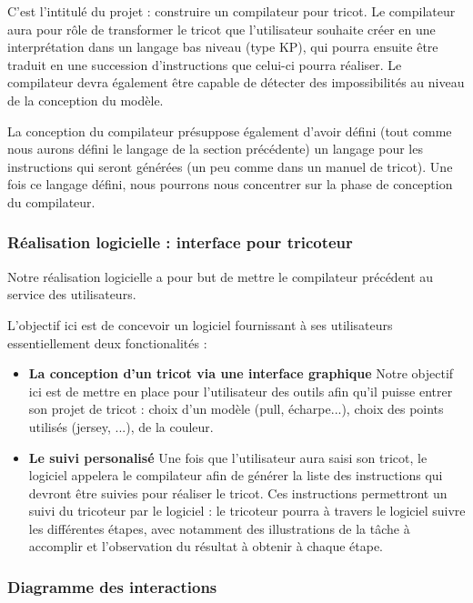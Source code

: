 \documentclass{article}
\begin{document}
C'est l'intitulé du projet : construire un compilateur pour tricot. Le compilateur aura pour rôle de transformer le tricot que
l'utilisateur souhaite créer en une interprétation dans un langage bas niveau (type KP), qui pourra ensuite être traduit en une succession
d'instructions que celui-ci pourra réaliser.
Le compilateur devra également être capable de détecter des impossibilités au niveau de la conception du modèle.

La conception du compilateur présuppose également d'avoir défini (tout comme nous aurons défini le langage de la section précédente) un
langage pour les instructions qui seront générées (un peu comme dans un manuel de tricot).
Une fois ce langage défini, nous pourrons nous concentrer sur la phase de conception du compilateur.

\subsubsection{Réalisation logicielle : interface pour tricoteur}

Notre réalisation logicielle a pour but de mettre le compilateur précédent au service des utilisateurs.

L'objectif ici est de concevoir un logiciel fournissant à ses utilisateurs essentiellement deux fonctionalités :
\begin{itemize}
  \item \textbf{La conception d'un tricot via une interface graphique} Notre objectif ici est de mettre en place pour l'utilisateur des
  outils afin qu'il puisse entrer son projet de tricot : choix d'un modèle (pull, écharpe...), choix des points utilisés
  (jersey, ...), de la couleur.
  \item \textbf{Le suivi personalisé} Une fois que l'utilisateur aura saisi son tricot, le logiciel appelera le compilateur afin de générer
la liste des instructions qui devront être suivies pour réaliser le tricot. Ces instructions permettront un suivi du tricoteur par le
logiciel : le tricoteur pourra à travers le logiciel suivre les différentes étapes, avec notamment des illustrations de la tâche à
accomplir et l'observation du résultat à obtenir à chaque étape.
\end{itemize}

\subsubsection{Diagramme des interactions}
\end{document}
